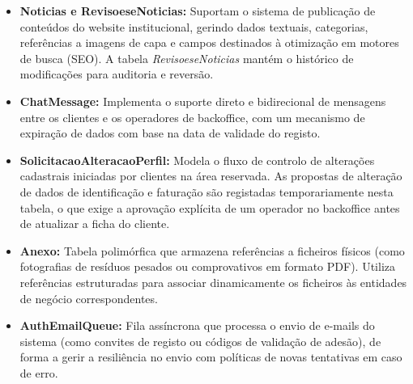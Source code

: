 \begin{itemize}
    \item \textbf{Noticias e RevisoeseNoticias:} Suportam o sistema de publicação de conteúdos do website institucional, gerindo dados textuais, categorias, referências a imagens de capa e campos destinados à otimização em motores de busca (\ac{SEO}). A tabela \textit{RevisoeseNoticias} mantém o histórico de modificações para auditoria e reversão.
    \item \textbf{ChatMessage:} Implementa o suporte direto e bidirecional de mensagens entre os clientes e os operadores de backoffice, com um mecanismo de expiração de dados com base na data de validade do registo.
    \item \textbf{SolicitacaoAlteracaoPerfil:} Modela o fluxo de controlo de alterações cadastrais iniciadas por clientes na área reservada. As propostas de alteração de dados de identificação e faturação são registadas temporariamente nesta tabela, o que exige a aprovação explícita de um operador no backoffice antes de atualizar a ficha do cliente.
    \item \textbf{Anexo:} Tabela polimórfica que armazena referências a ficheiros físicos (como fotografias de resíduos pesados ou comprovativos em formato \ac{PDF}). Utiliza referências estruturadas para associar dinamicamente os ficheiros às entidades de negócio correspondentes.
    \item \textbf{AuthEmailQueue:} Fila assíncrona que processa o envio de e-mails do sistema (como convites de registo ou códigos de validação de adesão), de forma a gerir a resiliência no envio com políticas de novas tentativas em caso de erro.
\end{itemize}

